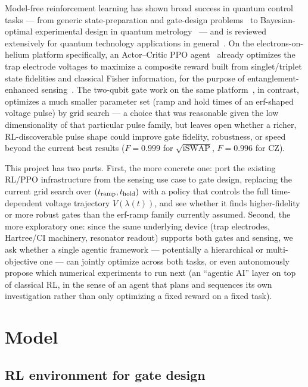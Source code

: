 \documentclass[aps,prapplied,reprint,superscriptaddress,longbibliography]{revtex4-2}
\begin{document}
Model-free reinforcement learning has shown broad success in quantum control tasks — from generic
state-preparation and gate-design problems~\cite{bukov2018reinforcement,niu2019universal} to
Bayesian-optimal experimental design in quantum metrology~\cite{belliardo2024model} — and is
reviewed extensively for quantum technology applications in general~\cite{bukov2026reinforcement}.
On the electrons-on-helium platform specifically, an Actor--Critic PPO
agent~\cite{schulman2017proximal} already optimizes the trap electrode voltages to maximize a
composite reward built from singlet/triplet state fidelities and classical Fisher information,
for the purpose of entanglement-enhanced sensing~\cite{perruzza2026}. The two-qubit gate work on the
same platform~\cite{leinonen2025}, in contrast, optimizes a much smaller parameter set (ramp and
hold times of an erf-shaped voltage pulse) by grid search — a choice that was reasonable given the
low dimensionality of that particular pulse family, but leaves open whether a richer,
RL-discoverable pulse shape could improve gate fidelity, robustness, or speed beyond the current
best results ($F=0.999$ for $\sqrt{\text{iSWAP}}$, $F=0.996$ for CZ).

This project has two parts. First, the more concrete one: port the existing RL/PPO infrastructure
from the sensing use case to gate design, replacing the current grid search over
$(t_{\rm ramp}, t_{\rm hold})$ with a policy that controls the full time-dependent voltage
trajectory $V(\lambda(t))$, and see whether it finds higher-fidelity or more robust gates than the
erf-ramp family currently assumed. Second, the more exploratory one: since the same underlying
device (trap electrodes, Hartree/CI machinery, resonator readout) supports both gates and sensing,
we ask whether a single agentic framework — potentially a hierarchical or multi-objective one — can
jointly optimize across both tasks, or even autonomously propose which numerical experiments to run
next (an ``agentic AI'' layer on top of classical RL, in the sense of an agent that plans and
sequences its own investigation rather than only optimizing a fixed reward on a fixed task).

\section{Model}

\subsection{RL environment for gate design}
\label{sec:rl-env-gate-design}
\end{document}
